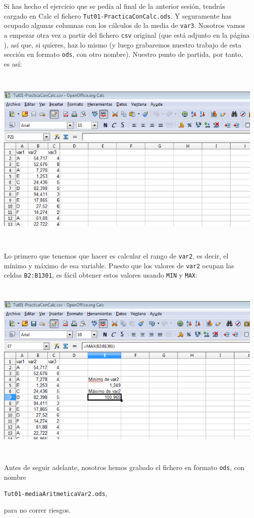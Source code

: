 \documentclass[10pt,a4paper]{article}\usepackage[]{graphicx}\usepackage[]{color}
\begin{document}
Si has hecho el ejercicio que se pedía al final de la anterior sesión, tendrás cargado en Calc el fichero {\tt Tut01-PracticaConCalc.ods}. Y seguramente has ocupado algunas columnas con los cálculos de la media de {\tt var3}. Nosotros vamos a empezar otra vez a partir del fichero {\tt csv} original (que está adjunto en la página \pageref{tut01:sec:TablasFrecuenciaSencillas}), así que, si quieres, haz lo mismo (y luego grabaremos nuestro trabajo de esta sección en formato {\tt ods}, con otro nombre). Nuestro punto de partida, por tanto, es así:
    \begin{center}
    \includegraphics[height=9cm]{../fig/Tut02-28.png}
    \end{center}
Lo primero que tenemos que hacer es calcular el {\sf rango} de {\tt var2}, es decir, el mínimo y máximo de esa variable. Puesto que los valores de {\tt var2} ocupan las celdas {\tt B2:B1301}, es fácil obtener estos valores usando {\tt MIN} y {\tt MAX}:
    \begin{center}
    \includegraphics[height=9cm]{../fig/Tut02-29.png}
    \end{center}
Antes de seguir adelante, nosotros hemos grabado el fichero en formato {\tt ods}, con nombre
    \begin{center}
    {\tt Tut01-mediaAritmeticaVar2.ods},
    \end{center}
para no correr riesgos.\\
\end{document}
